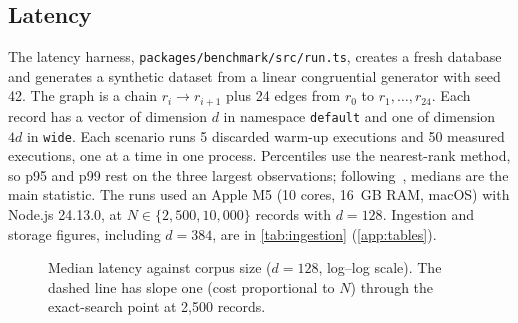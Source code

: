 \documentclass[preprint,12pt,a4paper]{elsarticle}
\newcommand{\code}[1]{\texttt{#1}}
\begin{document}
\subsection{Latency}
\label{sec:latency}

The latency harness, \nolinkurl{packages/benchmark/src/run.ts}, creates a fresh database and generates a synthetic dataset from a linear congruential generator with seed 42. The graph is a chain $r_i \to r_{i+1}$ plus 24 edges from $r_0$ to $r_1,\dots,r_{24}$. Each record has a vector of dimension $d$ in namespace \code{default} and one of dimension $4d$ in \code{wide}. Each scenario runs 5 discarded warm-up executions and 50 measured executions, one at a time in one process. Percentiles use the nearest-rank method, so p95 and p99 rest on the three largest observations; following~\cite{hoefler2015benchmarking}, medians are the main statistic. The runs used an Apple M5 (10 cores, 16~GB RAM, macOS) with Node.js 24.13.0, at $N \in \{2{,}500, 10{,}000\}$ records with $d = 128$. Ingestion and storage figures, including $d = 384$, are in \cref{tab:ingestion} (\ref{app:tables}).

\begin{table}[htbp]
\centering
\footnotesize
\caption{Latency in ms at $d = 128$, except the row marked $d = 512$. The hub start is $r_0$; the chain start is the middle of the chain. Mode A uses a label filter that matches every record; Mode B has no filter and expands in both directions.}
\label{tab:latency}

\end{table}

\begin{figure}[htbp]
\centering
{}
\caption{Median latency against corpus size ($d = 128$, log--log scale). The dashed line has slope one (cost proportional to $N$) through the exact-search point at 2,500 records.}
\label{fig:scaling}
\end{figure}
\end{document}
